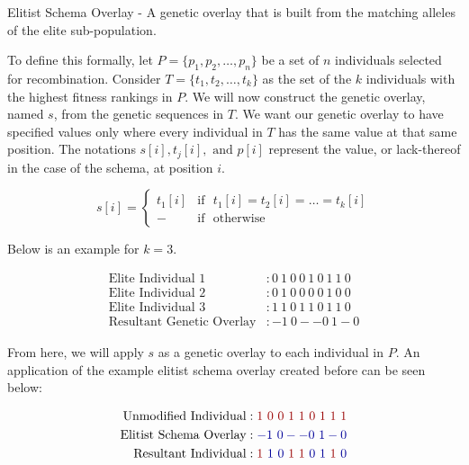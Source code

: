 \begin{overlay}
Elitist Schema Overlay - A genetic overlay that is built from the matching alleles of the elite sub-population.
\end{overlay}

To define this formally, let $P = \{p_1,p_2,\ldots,p_n\}$ be a set of $n$ individuals selected for recombination. Consider $T=\{t_1,t_2,\ldots,t_k\}$ as the set of the $k$ individuals with the highest fitness rankings in $P$. We will now construct the genetic overlay, named $s$, from the genetic sequences in $T$. We want our genetic overlay to  have specified values only where every individual in $T$ has the same value at that same position. The notations $s[i], t_j[i], \text{ and } p[i]$ represent the value, or lack-thereof in the case of the schema, at position $i$. 
 
 \begin{displaymath}
   s[i] = \left\{
     \begin{array}{cl}
       t_1[i] & \text{if~ } t_1[i] = t_2[i] = \ldots = t_k[i] \\
       - & \text{if~ } \text{otherwise} 
     \end{array}
   \right.
\end{displaymath} 

\noindent Below is an example for $k = 3$.

\begin{align*}
\text{Elite Individual 1} &: 0~1~0~0~1~0~1~1~0 			\\
\text{Elite Individual 2} &: 0~1~0~0~0~0~1~0~0 			\\
\text{Elite Individual 3} &: 1~1~0~1~1~0~1~1~0 			\\  
\text{Resultant Genetic Overlay} &:   -1~0--0~1-0			
\end{align*}

From here, we will apply $s$ as a genetic overlay to each individual in $P$. An application of the example elitist schema overlay created before can be seen below:

\begin{align*}
\text{Unmodified Individual} &: {\color{myred}1~0~0~1~1~0~1~1~1}		\\	
\text{Elitist Schema Overlay} &:   {\color{myblue}-1~0--0~1-0	}		\\  	
\text{Resultant Individual} &:  {\color{myred}1}~{\color{myblue}1~0}~ {\color{myred}1~1}~{\color{myblue}0~1}~ {\color{myred}1}~{\color{myblue}0}
\end{align*}


